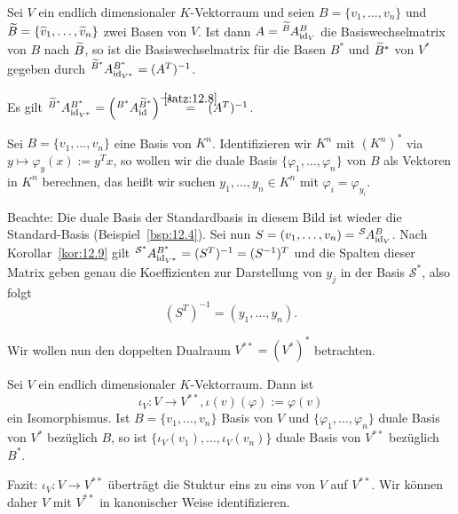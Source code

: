 \begin{korollar}
	\label{kor:12.9}
	Sei $V$ ein endlich dimensionaler $K$-Vektorraum und seien $B = \{v_1,\dots,v_n\}$ und $\widetilde{B} = \{\widetilde{v}_1,\dots,\widetilde{v}_n\}$ zwei Basen von $V$.
	Ist dann $A = \mat{A}{\wt{B}}{B}{\id_V}$ die Basiswechselmatrix von $B$ nach $\widetilde{B}$, so ist die Basiswechselmatrix für die Basen $B^*$ und $\widetilde{B}^*$ von $V^*$ gegeben durch $\mat{A}{\wt{B}^*}{B^*}{\id_{V^*}} = (A^T)^{-1}$.
\end{korollar}

\begin{beweis}
	Es gilt $\mat{A}{\wt{B}^*}{B^*}{\id_{V^*}} = \enb{\mat{A}{B^*}{\wt{B}^*}{\id}}^{-1} \stack{\ref{satz:12.8}}{=} (A^T)^{-1}$. 
\end{beweis}

\begin{anwendung}
	\label{anw:12.10}
	Sei $B = \{v_1,\dots,v_n\}$ eine Basis von $K^n$.
	Identifizieren wir $K^n$ mit $(K^n)^*$ via $y \mapsto \varphi_y(x) := y^Tx$, so wollen wir die duale Basis $\{\varphi_1,\dots,\varphi_n\}$ von $B$ als Vektoren in $K^n$ berechnen, das heißt wir suchen $y_1,\dots,y_n \in K^n$ mit $\varphi_i = \varphi_{y_i}$.
	
	Beachte: Die duale Basis der Standardbasis in diesem Bild ist wieder die Standard-Basis (Beispiel~\ref{bsp:12.4}).
	Sei nun $S = (v_1,\dots,v_n) = \mat{A}{\mathcal{S}}{B}{\id_V}$.
	Nach Korollar~\ref{kor:12.9} gilt $\mat{A}{\mathcal{S}^*}{B^*}{\id_{V^*}} = (S^T)^{-1} = (S^{-1})^T$ und die Spalten dieser Matrix geben genau die Koeffizienten zur Darstellung von $y_j$ in der Basis $\mathcal{S}^*$, also folgt
	\[
		(S^T)^{-1} = (y_1,\dots,y_n).
	\]
\end{anwendung}

Wir wollen nun den doppelten Dualraum $V^{**} = (V^*)^*$ betrachten.

\begin{satz}
	\label{satz:12.11}
	Sei $V$ ein endlich dimensionaler $K$-Vektorraum.
	Dann ist
	\[
		\iota_V \colon V \rightarrow V^{**}, \iota(v)(\varphi) := \varphi(v)
	\]
	ein Isomorphismus.
	Ist $B = \{v_1,\dots,v_n\}$ Basis von $V$ und $\{\varphi_1,\dots,\varphi_n\}$ duale Basis von $V^*$ bezüglich $B$, so ist $\{\iota_V(v_1),\dots,\iota_V(v_n)\}$ duale Basis von $V^{**}$ bezüglich $B^*$.
\end{satz}
  
Fazit: $\iota_V \colon V \rightarrow V^{**}$ überträgt die Stuktur eins zu eins von $V$ auf $V^{**}$.
Wir können daher $V$ mit $V^{**}$ in kanonischer Weise identifizieren.

